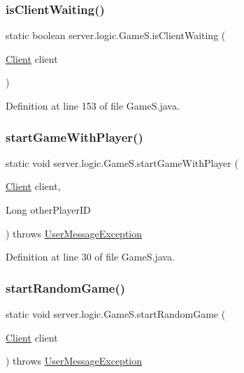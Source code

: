 \subsubsection{\texorpdfstring{is\+Client\+Waiting()}{isClientWaiting()}}
{\footnotesize\ttfamily static boolean server.\+logic.\+Game\+S.\+is\+Client\+Waiting (\begin{DoxyParamCaption}\item[{\hyperlink{classserver_1_1conn_1_1_client}{Client}}]{client }\end{DoxyParamCaption})\hspace{0.3cm}{\ttfamily [static]}}



Definition at line 153 of file Game\+S.\+java.

\hypertarget{classserver_1_1logic_1_1_game_s_a5233992ff9ace095e835a56bd439a55f}{}\label{classserver_1_1logic_1_1_game_s_a5233992ff9ace095e835a56bd439a55f} 
\subsubsection{\texorpdfstring{start\+Game\+With\+Player()}{startGameWithPlayer()}}
{\footnotesize\ttfamily static void server.\+logic.\+Game\+S.\+start\+Game\+With\+Player (\begin{DoxyParamCaption}\item[{\hyperlink{classserver_1_1conn_1_1_client}{Client}}]{client,  }\item[{Long}]{other\+Player\+ID }\end{DoxyParamCaption}) throws \hyperlink{classsharedlib_1_1exceptions_1_1_user_message_exception}{User\+Message\+Exception}\hspace{0.3cm}{\ttfamily [static]}}



Definition at line 30 of file Game\+S.\+java.

\hypertarget{classserver_1_1logic_1_1_game_s_a37c397e3097027a835b756a9c6584c14}{}\label{classserver_1_1logic_1_1_game_s_a37c397e3097027a835b756a9c6584c14} 
\subsubsection{\texorpdfstring{start\+Random\+Game()}{startRandomGame()}}
{\footnotesize\ttfamily static void server.\+logic.\+Game\+S.\+start\+Random\+Game (\begin{DoxyParamCaption}\item[{\hyperlink{classserver_1_1conn_1_1_client}{Client}}]{client }\end{DoxyParamCaption}) throws \hyperlink{classsharedlib_1_1exceptions_1_1_user_message_exception}{User\+Message\+Exception}\hspace{0.3cm}{\ttfamily [static]}}



